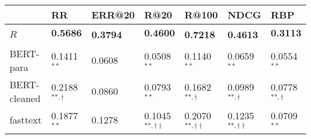 \begin{tabular}{lllllll}
\toprule
{} &                     RR &                ERR@20 &                          R@20 &                         R@100 &                          NDCG &                    RBP \\
\midrule
$R$          &   \textbf{0.5686}$^{}$ &  \textbf{0.3794}$^{}$ &          \textbf{0.4600}$^{}$ &          \textbf{0.7218}$^{}$ &          \textbf{0.4613}$^{}$ &   \textbf{0.3113}$^{}$ \\
BERT-para    &          0.1411$^{**}$ &           0.0608$^{}$ &                 0.0508$^{**}$ &                 0.1140$^{**}$ &                 0.0659$^{**}$ &          0.0554$^{**}$ \\
BERT-cleaned &  0.2188$^{**,\dagger}$ &           0.0860$^{}$ &                 0.0793$^{**}$ &         0.1682$^{**,\dagger}$ &         0.0989$^{**,\dagger}$ &  0.0778$^{**,\dagger}$ \\
fasttext     &          0.1877$^{**}$ &           0.1278$^{}$ &  0.1045$^{**,\dagger\dagger}$ &  0.2070$^{**,\dagger\dagger}$ &  0.1235$^{**,\dagger\dagger}$ &          0.0709$^{**}$ \\
\bottomrule
\end{tabular}
